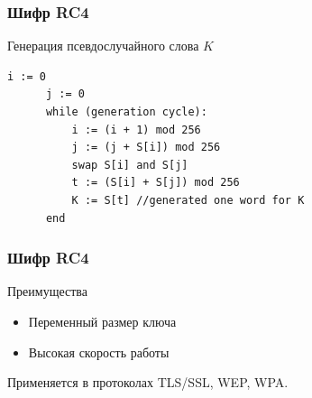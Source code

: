 \documentclass{beamer}
\begin{document}
\begin{frame}[fragile]
  \frametitle{Шифр RC4}

  \begin{block}{Генерация псевдослучайного слова $K$}
    \lstset{language=Pascal}
    \begin{lstlisting}[frame=single]
      i := 0
      j := 0
      while (generation cycle):
          i := (i + 1) mod 256
          j := (j + S[i]) mod 256
          swap S[i] and S[j]
          t := (S[i] + S[j]) mod 256
          K := S[t] //generated one word for K
      end
    \end{lstlisting}
  \end{block}
\end{frame}

\begin{frame}
  \frametitle{Шифр RC4}

  \begin{block}{Преимущества}
    \begin{itemize}
      \item{Переменный размер ключа}
      \item{Высокая скорость работы}
    \end{itemize}
  \end{block}

  Применяется в протоколах TLS/SSL, WEP, WPA.
\end{frame}
\end{document}
